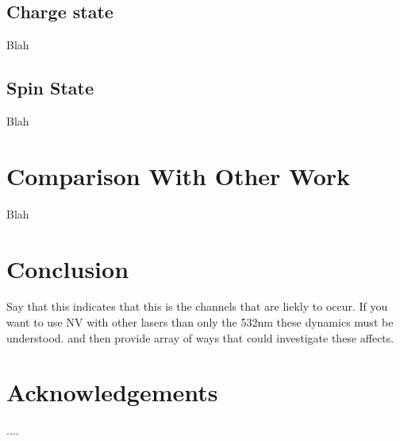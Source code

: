 \documentclass[preprint,prl,twocolumn]{revtex4}
\begin{document}
\subsection{Charge state}
Blah
\subsection{Spin State}
Blah

\section{Comparison With Other Work}
Blah

\section{Conclusion}
Say that this indicates that this is the channels that are liekly to occur. If you want to use NV with other lasers than only the 532nm these dynamics must be understood. and then provide array of ways that could investigate these affects.
    


\section*{Acknowledgements}

....

%
%
%




\begin{thebibliography}{27}






\end{thebibliography}
\end{document}
